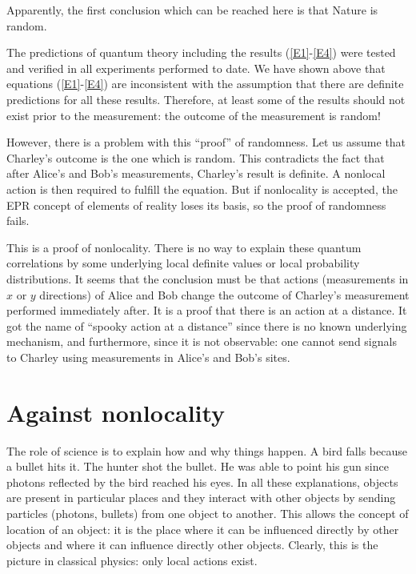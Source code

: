 \documentclass[11pt]{article}
\begin{document}
Apparently, the first  conclusion which can be reached here is that Nature is random.

The predictions of quantum theory including   the results (\ref{E1}-\ref{E4}) were tested and verified in all experiments performed to date. We have shown above that equations (\ref{E1}-\ref{E4}) are inconsistent with the assumption that there are definite predictions for all these results. Therefore, at least some of the results should not exist prior to the measurement: the outcome of the measurement is random!

However, there is a problem with this ``proof'' of randomness. Let us assume that Charley's outcome is the one which is random. This  contradicts the fact that after Alice's and Bob's measurements, Charley's result is definite. A nonlocal action is then required to  fulfill the equation. But if nonlocality is accepted, the EPR concept of elements of reality loses its basis, so the proof of randomness fails.

This is a proof of nonlocality. There is no way to explain these quantum correlations by some underlying local definite values or local probability distributions. It seems that the conclusion must be that actions (measurements in $x$ or $y$ directions) of Alice and Bob change the outcome of Charley's measurement performed immediately after. It is a proof that there is an action at a distance. It got the name of ``spooky action at a distance'' since there is no known underlying mechanism, and furthermore,  since it is not observable: one cannot send signals to Charley using measurements in Alice's and Bob's sites.

\section{Against nonlocality }

The role of science is to explain    how  and why things happen. A bird falls because a bullet hits it. The hunter shot the bullet. He was able to point his gun since photons reflected by the bird reached his eyes. In all these explanations, objects are present in particular places and they  interact with other objects by sending particles (photons, bullets) from one object to another. This  allows the concept of location of an object: it is the place where it can be influenced directly by  other objects and where it can influence directly other objects. Clearly, this is the picture in classical physics: only local actions exist.
\end{document}
